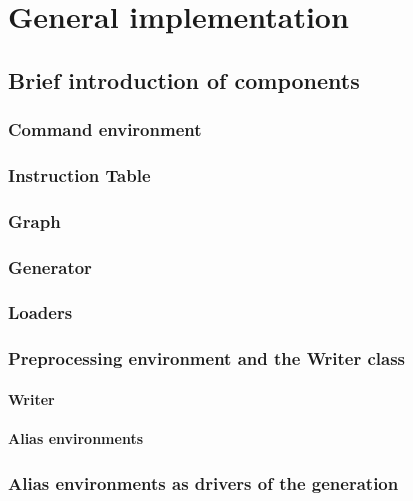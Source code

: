 \chapter{General implementation}

    \section{Brief introduction of components}

        \subsection{Command environment}

        \subsection{Instruction Table} 

        \subsection{Graph}

        \subsection{Generator}

        \subsection{Loaders}

        \subsection{Preprocessing environment and the Writer class}

            \subsubsection{Writer}

            \subsubsection{Alias environments}

        \subsection{Alias environments as drivers of the generation}

